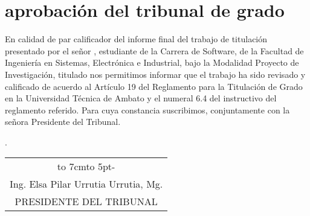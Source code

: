 \chapter*{aprobación del tribunal de grado}
En calidad de par calificador del informe final del trabajo de titulación presentado por el señor \autor, estudiante de la Carrera de Software, de la Facultad de Ingeniería en Sistemas, Electrónica e Industrial, bajo la Modalidad Proyecto de Investigación, titulado
	{\MakeUppercase\tema}
nos permitimos informar que el trabajo ha sido revisado
y calificado de acuerdo al Artículo 19 del Reglamento para la Titulación de Grado en
la Universidad Técnica de Ambato y el numeral 6.4 del instructivo del reglamento
referido. Para cuya constancia suscribimos, conjuntamente con la señora Presidente
del Tribunal.
\begin{flushright}
	\lugarFechaPrelims.
\end{flushright}


\vspace*{4cm}
\begin{center}
	\begin{tabular}{c}
		\hbox to 7cm{\leaders\hbox to 5pt{\hss-\hss}\hfil} \\
		Ing. Elsa Pilar Urrutia Urrutia, Mg.                 \\
		PRESIDENTE DEL TRIBUNAL                              \\
	\end{tabular}
\end{center}
\vspace*{20mm}
